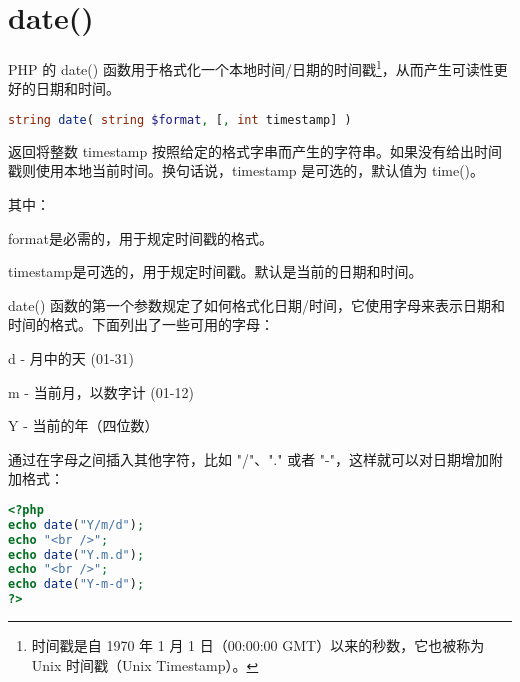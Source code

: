 \begin{lstlisting}[language=PHP]

\end{lstlisting}



\begin{lstlisting}[language=PHP]

\end{lstlisting}




\section{date()}



PHP 的 date() 函数用于格式化一个本地时间/日期的时间戳\footnote{时间戳是自 1970 年 1 月 1 日（00:00:00 GMT）以来的秒数，它也被称为 Unix 时间戳（Unix Timestamp）。}，从而产生可读性更好的日期和时间。

\begin{lstlisting}[language=PHP]
string date( string $format, [, int timestamp] )
\end{lstlisting}

返回将整数 timestamp 按照给定的格式字串而产生的字符串。如果没有给出时间戳则使用本地当前时间。换句话说，timestamp 是可选的，默认值为 time()。



其中：

\begin{compactitem}
\item format是必需的，用于规定时间戳的格式。
\item timestamp是可选的，用于规定时间戳。默认是当前的日期和时间。
\end{compactitem}


date() 函数的第一个参数规定了如何格式化日期/时间，它使用字母来表示日期和时间的格式。下面列出了一些可用的字母：

\begin{compactitem}
\item d - 月中的天 (01-31)
\item m - 当前月，以数字计 (01-12)
\item Y - 当前的年（四位数）
\end{compactitem}

通过在字母之间插入其他字符，比如 "/"、"." 或者 "-"，这样就可以对日期增加附加格式：


\begin{lstlisting}[language=PHP]
<?php
echo date("Y/m/d");
echo "<br />";
echo date("Y.m.d");
echo "<br />";
echo date("Y-m-d");
?>
\end{lstlisting}

